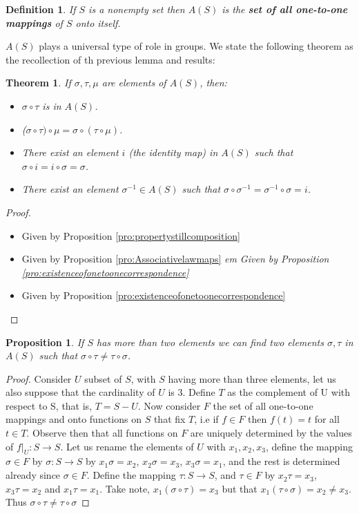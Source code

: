 \documentclass[11pt,a4paper]{article}
\newtheorem{define}{Definition}
\newtheorem{thm}{Theorem}
\newtheorem{claim}{Proposition}
\begin{document}
\begin{define}
	If $S$ is a nonempty set then $A(S)$ is the \textbf{set of all one-to-one mappings} of $S$ onto itself.
\end{define}
$A(S)$ plays a universal type of role in groups.
We state the following theorem as the recollection of th previous lemma and results:
\begin{thm}
	If $ \sigma, \tau, \mu $ are elements of $ A(S) $, then:
	\begin{itemize}
		\item $ \sigma \circ \tau $ is in $ A(S) $.
		\item ($\sigma \circ \tau) \circ \mu = \sigma \circ (\tau \circ \mu)$.
		\item There exist an element $i$ (the identity map) in $A(S)$ such that $ \sigma \circ i = i \circ \sigma = \sigma$.
		\item There exist an element $ \sigma^{-1} \in A(S)$ such that $ \sigma \circ \sigma^{-1} = \sigma^{-1} \circ \sigma = i$.
	\end{itemize}
\end{thm}
\begin{proof}
	\begin{itemize}
		\item Given by Proposition \ref{pro:propertystillcomposition}
		\item Given by Proposition \ref{pro:Associativelawmaps}
		\it	em Given by Proposition \ref{pro:existenceofonetoonecorrespondence}
		\item Given by Proposition \ref{pro:existenceofonetoonecorrespondence}
	\end{itemize}
\end{proof}

\begin{claim}
	If $S$ has more than two elements we can find two elements $\sigma, \tau$ in $A(S)$ such that $ \sigma \circ \tau \neq \tau \circ \sigma$.
\end{claim}

\begin{proof}
	Consider $U$ subset of $S$, with $S$ having more than three elements, let us also suppose that the cardinality of $U$ is $3$. Define $T$ as the complement of U with respect to S, that is, $T = S - U$. Now consider $F$ the set of all one-to-one mappings and onto functions on $S$ that fix $T$, i.e if $f \in F$ then $f(t) = t $ for all $t \in T$. Observe then that all functions on $F$ are uniquely determined by the values of $f \vert_{U} : S \rightarrow S$. Let us rename the elements of $U$ with $x_1,x_2,x_3$, define the mapping $\sigma \in F$ by $\sigma: S \rightarrow S$ by $x_1 \sigma = x_2$, $x_2 \sigma = x_3$, $x_3 \sigma = x_1$, and the rest is determined already since $ \sigma \in F$. Define the mapping $ \tau: S \rightarrow S$, and $ \tau \in F$ by $x_2 \tau = x_3$, $x_3\tau = x_2$ and $ x_1 \tau = x_1$. Take note, $x_1(\sigma \circ \tau) = x_3$ but that  $ x_1(\tau \circ \sigma) = x_2 \neq x_3$. Thus $ \sigma \circ \tau \neq \tau \circ \sigma$ 
\end{proof}
\end{document}
